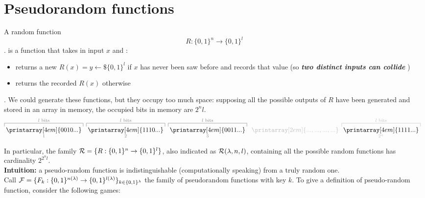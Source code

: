 \hline
\section{Pseudorandom functions}

A random function
\[  R:\{0,1\}^{n} \to \{0,1\}^{l} \].
is a function that takes in input $x$ and :
\begin{itemize}
    \item returns a new $R(x)=y \leftarrow\$ \{0,1\}^{l}$ if $x$ has never been
        saw before and records that value (so \textbf{ \textit{two distinct inputs can collide} })

    \item returns the recorded $R(x)$ otherwise
\end{itemize}.
We could generate these functions, but they occupy too much space: supposing all
the possible outputs of $R$ have been generated and stored in an array in memory, the
occupied bits in memory are $2^{n}l$.
\[  
    \color{black!50}%
  
    \overbracket[0.5pt][5pt]{{\thickspace}%
    \color{black}\printarray[4em]{0010...}\thickspace}^{l\textrm{ bits}}_{1}\thickspace%
    \overbracket[0.5pt][5pt]{{\thickspace}%
    \color{black}\printarray[4em]{1110...}\thickspace}^{l\textrm{ bits}}_{2}\thickspace%
    \overbracket[0.5pt][5pt]{{\thickspace}%
      \color{black}\printarray[4em]{0011...}\thickspace}^{l\textrm{ bits}}_{3}\thickspace%
    \color{black!25}\underbracket[0pt][5.5pt]{{\thickspace}%
      \printarray[2em]{...,...,...,...}\thickspace}_{}%
    \overbracket[0.5pt][5pt]{{\thickspace}%
      \color{black}\printarray[4em]{1111...}\thickspace}^{l\textrm{ bits}}_{2^{n}}\thickspace%
  \thickspace

\]
In particular, the family $\mathcal{R}=\{ R:\{0,1\}^{n} \to \{0,1\}^{l} \}$, also
indicated as $\mathcal{R}(\lambda, n, l)$,  containing
all the possible random functions has cardinality $2^{2^{n}l}$.\\

\textbf{Intuition:} a pseudo-random function is indistinguishable
(computationally speaking) from a truly random one.\\

Call $\mathcal{F}=\{ F_{k}:\{0,1\}^{n(\lambda)} \to \{0,1\}^{l(\lambda)} \}_{k \in
\{0,1\}^{\lambda}}$ the family of pseudorandom functions with key $k$. To give a
definition of pseudo-random function, consider the following games:




